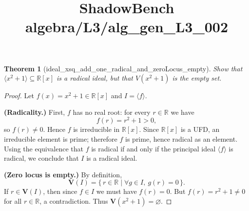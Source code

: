 \documentclass{article}
\title{ShadowBench algebra/L3/alg\_gen\_L3\_002}
\newtheorem{theorem}{Theorem}
\begin{document}
\maketitle

\begin{theorem}[ideal_xsq_add_one_radical_and_zeroLocus_empty]
Show that $\langle x^2 + 1\rangle \subseteq \mathbb{R}[x]$ is a radical ideal, but that $V(x^2 + 1)$ is the empty set.
\end{theorem}

\begin{proof}
Let $f(x)=x^2+1\in\mathbb{R}[x]$ and $I=\langle f\rangle$.

\medskip
\noindent\textbf{(Radicality.)}
First, $f$ has no real root: for every $r\in\mathbb{R}$ we have
\[
f(r)=r^2+1>0,
\]
so $f(r)\neq 0$. Hence $f$ is irreducible in $\mathbb{R}[x]$.
Since $\mathbb{R}[x]$ is a UFD, an irreducible element is prime; therefore $f$ is prime, hence radical as an element.
Using the equivalence that $f$ is radical if and only if the principal ideal $\langle f\rangle$ is radical,
we conclude that $I$ is a radical ideal.

\medskip
\noindent\textbf{(Zero locus is empty.)}
By definition,
\[
\mathbf{V}(I)=\{\, r\in\mathbb{R}\mid \forall g\in I,\ g(r)=0 \,\}.
\]
If $r\in\mathbf{V}(I)$, then since $f\in I$ we must have $f(r)=0$.
But $f(r)=r^2+1\neq 0$ for all $r\in\mathbb{R}$, a contradiction.
Thus $\mathbf{V}(x^2+1)=\varnothing$.
\end{proof}
\end{document}

